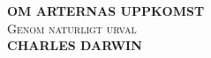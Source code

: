 \begin{titlepage}
\pagecolor{darkblue}
\begin{center}
\vspace*{3cm}
{\LARGE \bf \color{white} OM ARTERNAS UPPKOMST}\\[0.5cm]

\textsc{\large \color{white} Genom naturligt urval}\\[1.2cm]


{\normalsize \bf \color{white} CHARLES DARWIN}\\[0.3cm]

\end{center}

\end{titlepage}

